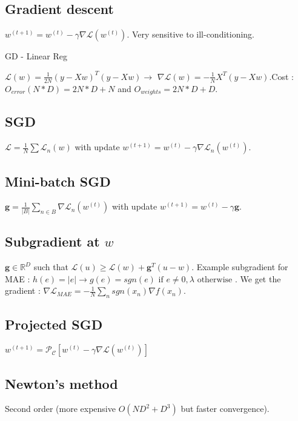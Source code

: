 \subsection{Gradient descent}

$w^{(t+1)} = w^{(t)} - \gamma \nabla \mathcal{L}(w^{(t)})$. Very sensitive to ill-conditioning.

GD - Linear Reg

$\mathcal{L}(w) = \frac{1}{2N} (y - Xw)^T(y - Xw) \rightarrow$ \newline $ \nabla \mathcal{L}(w) = - \frac{1}{N} X^T(y - Xw)$.\newline Cost : $O_{error}(N*D) = 2N*D + N$ and $O_{weights} = 2N*D + D$.

\subsection{SGD} 

$\mathcal{L} = \frac{1}{N} \sum{\mathcal{L}}_n(w)$ with update $w^{(t+1)} = w^{(t)} - \gamma \nabla \mathcal{L}_n(w^{(t)})$.

\subsection{Mini-batch SGD}

$\mathbf{g} = \frac{1}{|B|} \sum_{n\in B}{\nabla \mathcal{L}}_n(w^{(t)})$ with update $w^{(t+1)} = w^{(t)} - \gamma \mathbf{g}$.

\subsection{Subgradient at $w$}

$\mathbf{g} \in \mathbb{R}^D$ such that $\mathcal{L}(u) \ge \mathcal{L}(w) + \mathbf{g}^T (u-w)$. Example subgradient for MAE : $h(e) = |e| \rightarrow g(e) = {sgn(e) \text{ if } e \ne 0, \lambda \text{ otherwise }}$. We get the gradient : $\nabla \mathcal{L}_{MAE} = - \frac{1}{N} \sum_n sgn(x_n) \nabla f(x_n)$.

\subsection{Projected SGD}

$w^{(t+1)} = \mathcal{P_C} [w^{(t)} - \gamma \nabla \mathcal{L}(w^{(t)})]$

\subsection{Newton's method}
Second order (more expensive $O(ND^2 + D^3)$ but faster convergence).

